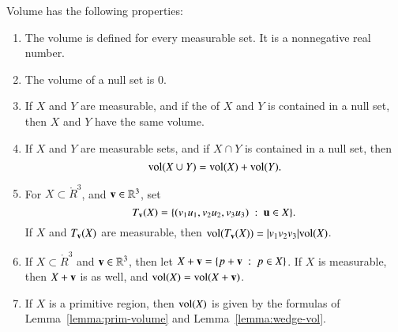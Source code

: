 \begin{lemma}[volume]\label{lemma:volume} 
Volume  has the following properties:
%
\begin{enumerate}%
\item {} The volume is defined for every measurable set.  It is
a nonnegative real number.
\item {} The volume of a null set is $0$.
\item {} If $X$ and $Y$ are  measurable, and if
the  of
$X$ and $Y$ is contained in a null set, then 
$X$ and $Y$ have the same volume.  
\item {} If $X$ and $Y$ are measurable sets, and if $X\cap
Y$ is contained in a null set, then
\[ 
{\operatorname{vol}}(X\cup Y) = {\operatorname{vol}}(X) + {\operatorname{vol}}(Y).
\] 
%
%
\item {} For $X\subset \ring{R}^3$, and
${\mathbf v}\in\mathbb{R}^3$, set
\[ 
T_{\mathbf v}(X) = \{ (v_1u_1,v_2u_2,v_3u_3) \ :\  {\mathbf u}\in X\}.
\] 
%
If $X$ and $T_{\mathbf v}(X)$ are measurable, then
${\operatorname{vol}}(T_{\mathbf v}(X)) = |v_1v_2v_3|{\operatorname{vol}}(X)$.
\item {} If $X\subset \ring{R}^3$ and ${\mathbf v}\in\mathbb{R}^3$,
then let $X+{\mathbf v} = \{p + {\mathbf v}\ :\  p\in X\}$.  If $X$ is measurable,
then $X+{\mathbf v}$ is as well, and ${\operatorname{vol}}(X) = {\operatorname{vol}}(X+{\mathbf v})$.
\item {} If $X$ is a primitive region, then 
 ${\operatorname{vol}}(X)$ is given by the formulas of
Lemma~\ref{lemma:prim-volume} and Lemma~\ref{lemma:wedge-vol}.  
\end{enumerate}
\end{lemma}
%
%
%

